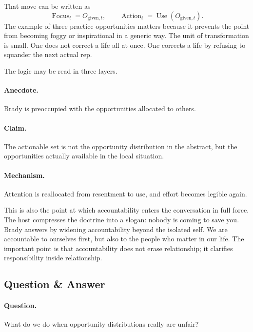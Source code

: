 That move can be written as
\begin{equation}
\operatorname{Focus}_t = O_{\text{given},t},
\qquad
\operatorname{Action}_t = \operatorname{Use}(O_{\text{given},t}).
\end{equation}
The example of three practice opportunities matters because it prevents the point from becoming foggy or inspirational in a generic way. The unit of transformation is small. One does not correct a life all at once. One corrects a life by refusing to squander the next actual rep.

The logic may be read in three layers.

\paragraph{Anecdote.} Brady is preoccupied with the opportunities allocated to others.

\paragraph{Claim.} The actionable set is not the opportunity distribution in the abstract, but the opportunities actually available in the local situation.

\paragraph{Mechanism.} Attention is reallocated from resentment to use, and effort becomes legible again.

This is also the point at which accountability enters the conversation in full force. The host compresses the doctrine into a slogan: nobody is coming to save you. Brady answers by widening accountability beyond the isolated self. We are accountable to ourselves first, but also to the people who matter in our life. The important point is that accountability does not erase relationship; it clarifies responsibility inside relationship.

\subsection{Question \& Answer}

\paragraph{Question.} What do we do when opportunity distributions really are unfair?

